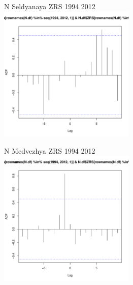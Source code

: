 \documentclass[12pt, a4paper]{disser}
\begin{document}
	\begin{figure}[ht]
	
	\begin{minipage}[b]{.46\linewidth}
	\begin{center}
	{\tiny  N Seldyanaya ZRS 1994 2012}
		\includegraphics[width=65mm]{../White_Sea/dynamic_N_N1/crosscorr_N_Seldyanaya_ZRS_1994_2012.pdf}

	\end{center}
	\end{minipage}
	\hfil %
	\begin{minipage}[b]{.46\linewidth}
	\begin{center}
	{\tiny   N Medvezhya ZRS 1994 2012}
		\includegraphics[width=65mm]{../White_Sea/dynamic_N_N1/crosscorr_N_Medvezhya_ZRS_1994_2012.pdf}
	\end{center}
	\end{minipage}




\end{figure}
\end{document}
